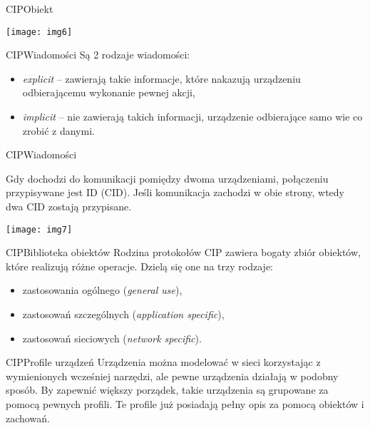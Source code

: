 \documentclass[11pt]{beamer}
\begin{document}
\begin{frame}{CIP}{Obiekt}
\begin{center}
	\texttt{[image: img6]}
\end{center}
\end{frame}


\begin{frame}{CIP}{Wiadomości}
Są 2 rodzaje wiadomości:
\begin{itemize}
\item \emph{explicit} -- zawierają takie informacje, które nakazują urządzeniu odbierającemu wykonanie pewnej akcji,
\item \emph{implicit} -- nie zawierają takich informacji, urządzenie odbierające samo wie co zrobić z danymi.
\end{itemize}
\end{frame}


\begin{frame}{CIP}{Wiadomości}

Gdy dochodzi do komunikacji pomiędzy dwoma urządzeniami, połączeniu przypisywane jest ID (CID). Jeśli komunikacja zachodzi w obie strony, wtedy dwa CID zostają przypisane.

\medskip

\begin{center}
	\texttt{[image: img7]}
\end{center}
\end{frame}


\begin{frame}{CIP}{Biblioteka obiektów}
Rodzina protokołów CIP zawiera bogaty zbiór obiektów, które realizują różne operacje. Dzielą się one na trzy rodzaje:
\begin{itemize}
\item zastosowania ogólnego (\emph{general use}),
\item zastosowań szczególnych (\emph{application specific}),
\item zastosowań sieciowych (\emph{network specific}).
\end{itemize}
\end{frame}


\begin{frame}{CIP}{Profile urządzeń}
Urządzenia można modelować w sieci korzystając z wymienionych wcześniej narzędzi, ale pewne urządzenia działają w podobny sposób. By zapewnić większy porządek, takie urządzenia są grupowane za pomocą pewnych profili. Te profile już posiadają pełny opis za pomocą obiektów i zachowań.
\end{frame}
\end{document}
